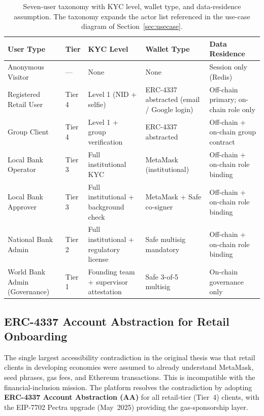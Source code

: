 \documentclass[12pt,a4paper]{report}
\begin{document}
\begin{table}[H]
\centering
\caption{Seven-user taxonomy with KYC level, wallet type, and data-residence assumption. The taxonomy expands the actor list referenced in the use-case diagram of Section~\ref{sec:usecase}.}
\label{tab:user-taxonomy}
\small
\begin{tabular}{p{3.1cm}p{1.4cm}p{2.6cm}p{2.4cm}p{3.4cm}}
\hline
\textbf{User Type} & \textbf{Tier} & \textbf{KYC Level} & \textbf{Wallet Type} & \textbf{Data Residence} \\
\hline
Anonymous Visitor & --- & None & None & Session only (Redis) \\
\hline
Registered Retail User & Tier 4 & Level 1 (NID + selfie) & ERC-4337 abstracted (email / Google login) & Off-chain primary; on-chain role only \\
\hline
Group Client & Tier 4 & Level 1 + group verification & ERC-4337 abstracted & Off-chain + on-chain group contract \\
\hline
Local Bank Operator & Tier 3 & Full institutional KYC & MetaMask (institutional) & Off-chain + on-chain role binding \\
\hline
Local Bank Approver & Tier 3 & Full institutional + background check & MetaMask + Safe co-signer & Off-chain + on-chain role binding \\
\hline
National Bank Admin & Tier 2 & Full institutional + regulatory license & Safe multisig mandatory & Off-chain + on-chain role binding \\
\hline
World Bank Admin (Governance) & Tier 1 & Founding team + supervisor attestation & Safe 3-of-5 multisig & On-chain governance only \\
\hline
\end{tabular}
\end{table}

\subsection{ERC-4337 Account Abstraction for Retail Onboarding}
\label{sec:erc4337}

The single largest accessibility contradiction in the original thesis was that retail clients in developing economies were assumed to already understand MetaMask, seed phrases, gas fees, and Ethereum transactions. This is incompatible with the financial-inclusion mission. The platform resolves the contradiction by adopting \textbf{ERC-4337 Account Abstraction (AA)} for all retail-tier (Tier~4) clients, with the EIP-7702 Pectra upgrade (May~2025) providing the gas-sponsorship layer.
\end{document}
